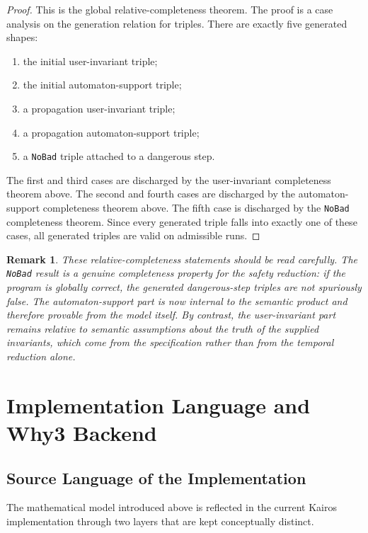 \documentclass[11pt,a4paper]{article}
\newtheorem{remark}[definition]{Remark}
\begin{document}
\begin{proof}
This is the global relative-completeness theorem. The proof
is a case analysis on the generation relation for triples. There are exactly
five generated shapes:
\begin{enumerate}[leftmargin=1.4em]
\item the initial user-invariant triple;
\item the initial automaton-support triple;
\item a propagation user-invariant triple;
\item a propagation automaton-support triple;
\item a \texttt{NoBad} triple attached to a dangerous step.
\end{enumerate}
The first and third cases are discharged by the user-invariant completeness
theorem above. The second and fourth cases are discharged by the automaton-
support completeness theorem above. The fifth case is discharged by the
\texttt{NoBad} completeness theorem. Since every generated triple falls into
exactly one of these cases, all generated triples are valid on admissible
runs.
\end{proof}

\begin{remark}
These relative-completeness statements should be read carefully. The
\texttt{NoBad} result is a genuine completeness property for the safety
reduction: if the program is globally correct, the generated dangerous-step
triples are not spuriously false. The automaton-support part is now internal to
the semantic product and therefore provable from the model itself. By contrast,
the user-invariant part remains \emph{relative} to semantic assumptions about
the truth of the supplied invariants, which come from the specification rather
than from the temporal reduction alone.
\end{remark}

\section{Implementation Language and Why3 Backend}

\subsection{Source Language of the Implementation}

The mathematical model introduced above is reflected in the current Kairos
implementation through two layers that are kept conceptually distinct.
\end{document}

